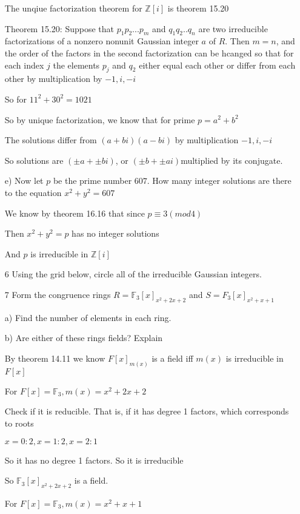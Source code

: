 \documentclass[12pt]{article}
\begin{document}
\begin{itemize}
		The unqiue factorization theorem for $\mathbb{Z}[i]$ is theorem 15.20

		Theorem 15.20: Suppose that $p_1 p_2 ... p_m$ and $q_1 q_2 .. q_n$ are two irreducible factorizations of a nonzero nonunit Gaussian integer $a$ of $R$. Then $m = n$, and the order of the factors in the second factorization can be hcanged so that for each index $j$ the elements $p_j$ and $q_2$ either equal each other or differ from each other by multiplication by $-1, i, -i$

		So for $11^2 + 30^2 = 1021$

		So by unique factorization, we know that for prime $p = a^2 + b^2$

		The solutions differ from $(a+bi)(a-bi)$ by multiplication $-1, i, -i$

		So solutions are $(\pm a + \pm bi)$, or $(\pm b + \pm ai)$multiplied by its conjugate.


		e) Now let $p$ be the prime number $607$. How many integer solutions are there to the equation $x^2 + y^2 = 607$

		We know by theorem 16.16 that since $p \equiv 3 (mod 4)$

		Then $x^2 + y^2 = p$ has no integer solutions
		
		And $p$ is irreducible in $\mathbb{Z}[i]$

	\item[6] Using the grid below, circle all of the irreducible Gaussian integers.

	\item[7] Form the congruence rings $R = \mathbb{F}_3[x]_{x^2 + 2x + 2}$ and $S = F_3[x]_{x^2 + x + 1}$

		a) Find the number of elements in each ring.

		b) Are either of these rings fields? Explain

		By theorem 14.11 we know $F[x]_{m(x)}$ is a field iff $m(x)$ is irreducible in $F[x]$

		For $F[x] = \mathbb{F}_3, m(x) = x^2 + 2x + 2$

		Check if it is reducible. That is, if it has degree 1 factors, which corresponds to roots

		$x = 0: 2, x = 1: 2, x = 2: 1$

		So it has no degree 1 factors. So it is irreducible

		So $\mathbb{F}_3[x]_{x^2 + 2x + 2}$ is a field.

		For $F[x] = \mathbb{F}_3, m(x) = x^2 + x + 1$


\end{itemize}
\end{document}
